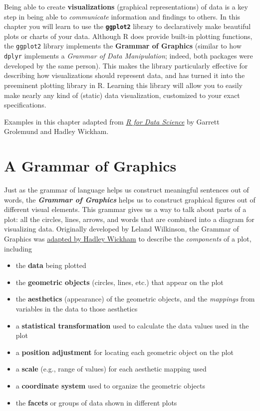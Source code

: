 \documentclass[]{book}
\providecommand{\tightlist}{%
  \setlength{\itemsep}{0pt}\setlength{\parskip}{0pt}}
\theoremstyle{definition}
\theoremstyle{definition}
\theoremstyle{remark}
\begin{document}
Being able to create \textbf{visualizations} (graphical representations)
of data is a key step in being able to \emph{communicate} information
and findings to others. In this chapter you will learn to use the
\textbf{\texttt{ggplot2}} library to declaratively make beautiful plots
or charts of your data. Although R does provide built-in plotting
functions, the \texttt{ggplot2} library implements the \textbf{Grammar
of Graphics} (similar to how \texttt{dplyr} implements a \emph{Grammar
of Data Manipulation}; indeed, both packages were developed by the same
person). This makes the library particularly effective for describing
how visualizations should represent data, and has turned it into the
preeminent plotting library in R. Learning this library will allow you
to easily make nearly any kind of (static) data visualization,
customized to your exact specifications.

Examples in this chapter adapted from
\href{http://r4ds.had.co.nz/}{\emph{R for Data Science}} by Garrett
Grolemund and Hadley Wickham.

\section{A Grammar of Graphics}\label{a-grammar-of-graphics}

Just as the grammar of language helps us construct meaningful sentences
out of words, the \textbf{\emph{Grammar of Graphics}} helps us to
construct graphical figures out of different visual elements. This
grammar gives us a way to talk about parts of a plot: all the circles,
lines, arrows, and words that are combined into a diagram for
visualizing data. Originally developed by Leland Wilkinson, the Grammar
of Graphics was
\href{http://vita.had.co.nz/papers/layered-grammar.pdf}{adapted by
Hadley Wickham} to describe the \emph{components} of a plot, including

\begin{itemize}
\tightlist
\item
  the \textbf{data} being plotted
\item
  the \textbf{geometric objects} (circles, lines, etc.) that appear on
  the plot
\item
  the \textbf{aesthetics} (appearance) of the geometric objects, and the
  \emph{mappings} from variables in the data to those aesthetics
\item
  a \textbf{statistical transformation} used to calculate the data
  values used in the plot
\item
  a \textbf{position adjustment} for locating each geometric object on
  the plot
\item
  a \textbf{scale} (e.g., range of values) for each aesthetic mapping
  used
\item
  a \textbf{coordinate system} used to organize the geometric objects
\item
  the \textbf{facets} or groups of data shown in different plots
\end{itemize}
\end{document}
